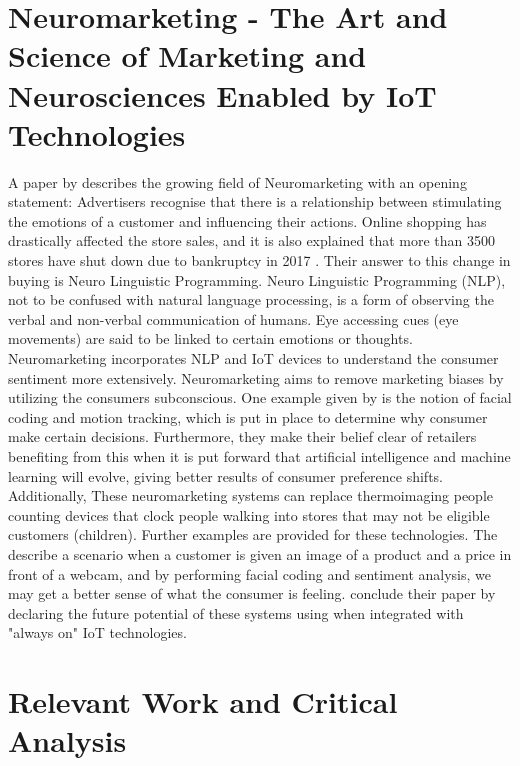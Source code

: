 \section{Neuromarketing - The Art and Science of Marketing and Neurosciences Enabled by IoT Technologies}
A paper by \citeauthor{arthmann} describes the growing field of Neuromarketing with an opening statement: Advertisers recognise that there is a relationship between stimulating the emotions of a customer and influencing their actions. Online shopping has drastically affected the store sales, and it is also explained that more than 3500 stores have shut down due to bankruptcy in 2017 \citep{arthmann}. Their answer to this change in buying is Neuro Linguistic Programming. Neuro Linguistic Programming (NLP), not to be confused with natural language processing, is a form of observing the verbal and non-verbal communication of humans. Eye accessing cues (eye movements) are said to be linked to certain emotions or thoughts. Neuromarketing incorporates NLP and IoT devices to understand the consumer sentiment more extensively. Neuromarketing aims to remove marketing biases by utilizing the consumers subconscious. One example given by \citeauthor{arthmann} is the notion of facial coding and motion tracking, which is put in place to determine why consumer make certain decisions. 
Furthermore, they make their belief clear of retailers benefiting from this when it is put forward that artificial intelligence and machine learning will evolve, giving better results of consumer preference shifts. Additionally, These neuromarketing systems can replace thermoimaging people counting devices that clock people walking into stores that may not be eligible customers (children). Further examples are provided for these technologies. The describe a scenario when a customer is given an image of a product and a price in front of a webcam, and by performing facial coding and sentiment analysis, we may get a better sense of what the consumer is feeling.
\citeauthor{arthmann} conclude their paper by declaring the future potential of these systems using when integrated with "always on" IoT technologies. 

\section{Relevant Work and Critical Analysis}

